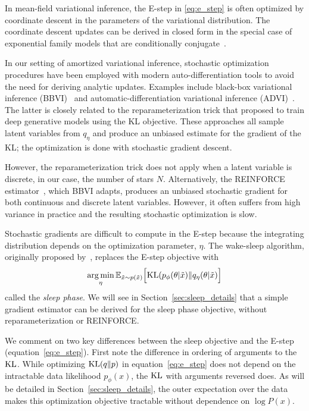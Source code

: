 In mean-field variational inference, the E-step in \eqref{eq:e_step} is often optimized by coordinate descent in the parameters of the variational distribution. 
The coordinate descent updates can be derived in closed form in the special case of exponential family models that are conditionally conjugate~\cite{Blei_2017_vi_review}. 

In our setting of amortized variational inference, stochastic 
optimization procedures have been employed with modern 
auto-differentiation tools to avoid the need for deriving 
analytic updates. Examples include black-box variational inference (BBVI)~\cite{ranganath2013black} 
and automatic-differentiation variational inference (ADVI)~\cite{kucukelbir2016automatic}. The latter 
is closely related to the reparameterization trick that \cite{kingma2013autoencoding, rezende2014stochastic} proposed to train deep generative models using the KL objective. 
These approaches all sample latent variables from $q_\eta$ and produce an unbiased estimate 
for the gradient of the KL; the optimization is done with stochastic gradient descent. 

However, the reparameterization trick does not apply when a latent variable is discrete, in our case, the number of stars $N$. Alternatively, the REINFORCE estimator~\cite{Williams1992reinforce}, which BBVI adapts, produces an unbiased stochastic gradient for both continuous and discrete latent variables. However, it often suffers from high variance in practice and the resulting stochastic optimization is slow. 

Stochastic gradients are difficult to compute in the E-step because the integrating distribution depends on the optimization parameter, $\eta$. 
The wake-sleep algorithm, originally proposed by~\cite{Hinton1995wake_sleep}, replaces the 
E-step objective with 
\begin{align}
    \operatorname*{arg\,min}_{\eta} \mathbb{E}_{\tilde x \sim p(\tilde x)}\Big[\textrm{KL}(p_\phi(\theta | \tilde x) \| q_\eta(\theta | \tilde x)\Big]
    \label{eq:sleep_obj}
\end{align}
called the {\itshape sleep phase}. We will see in Section~\ref{sec:sleep_details} that a simple gradient estimator can be derived for the sleep phase objective, without 
reparameterization or REINFORCE. 

We comment on two key differences between the sleep objective and the E-step (equation~\eqref{eq:e_step}). First note the difference in ordering of arguments to the $\textrm{KL}$. 
While optimizing $\textrm{KL}(q\|p)$ in equation~\eqref{eq:e_step} does not depend on the intractable 
data likelihood $p_\phi(x)$, the $\textrm{KL}$ with arguments reversed does. 
As will be detailed in Section~\ref{sec:sleep_details}, the outer expectation over the data makes this optimization objective tractable without dependence on $\log P(x)$. 

